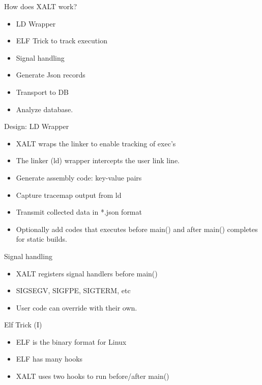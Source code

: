 \documentclass{beamer}
\begin{document}
\begin{frame}{How does XALT work?}
  \begin{itemize}
    \item LD Wrapper
    \item ELF Trick to track execution
    \item Signal handling
    \item Generate Json records
    \item Transport to DB
    \item Analyze database.
  \end{itemize}
\end{frame}

\begin{frame}{Design: LD Wrapper}
  \begin{itemize}
    \item XALT wraps the linker to enable tracking of exec's
    \item The linker (ld) wrapper intercepts the user link line.
    \item Generate assembly code: key-value pairs
    \item Capture tracemap output from ld
    \item Transmit collected data in *.json format
    \item Optionally add codes that executes before main() and after
      main() completes for static builds.
  \end{itemize}
\end{frame}


\begin{frame}{Signal handling}
  \begin{itemize}
    \item XALT registers signal handlers before main()
    \item SIGSEGV, SIGFPE, SIGTERM, etc
    \item User code can override with their own.
  \end{itemize}
\end{frame}

\begin{frame}{Elf Trick (I)}
  \begin{itemize}
    \item ELF is the binary format for Linux
    \item ELF has many hooks
    \item XALT uses two hooks to run before/after main()
  \end{itemize}
\end{frame}
\end{document}
